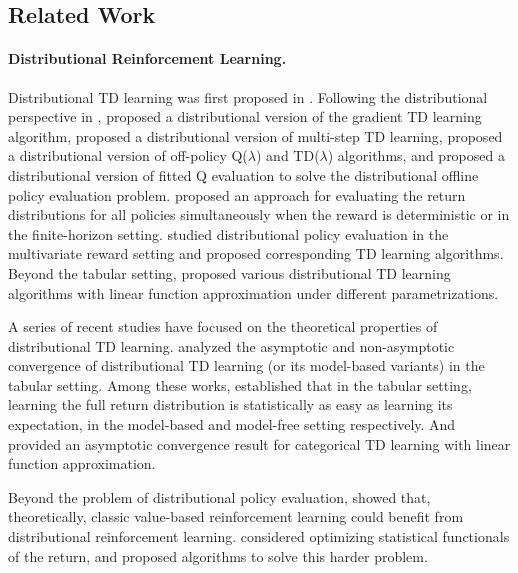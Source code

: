 \subsection{Related Work}
\paragraph{Distributional Reinforcement Learning.}
Distributional TD learning was first proposed in \citep{bellemare2017distributional}.
Following the distributional perspective in \citep{bellemare2017distributional}, \cite{pmlr-v97-qu19b} proposed a distributional version of the gradient TD learning algorithm,
\cite{tang2022nature} proposed a distributional version of multi-step TD learning, \cite{tang2024off} proposed a distributional version of off-policy Q($\lambda$) and TD($\lambda$) algorithms, and \citet{pmlr-v202-wu23s} proposed a distributional version of fitted Q evaluation to solve the distributional offline policy evaluation problem.
\cite{wiltzer2024dsm} proposed an approach for evaluating the return distributions for all policies simultaneously when the reward is deterministic or in the finite-horizon setting. 
\cite{wiltzer2024foundations} studied distributional policy evaluation in the multivariate reward setting and proposed corresponding TD learning algorithms.
Beyond the tabular setting, \cite{bellemare2019distributional,lyle2019comparative,bdr2022} proposed various distributional TD learning algorithms with linear function approximation under different parametrizations.

A series of recent studies have focused on the theoretical properties of distributional TD learning.
\cite{rowland2018analysis,speedy,zhang2023estimation,rowland2024analysis,rowland2024nearminimaxoptimal,peng2024statistical} analyzed the asymptotic and non-asymptotic convergence of distributional TD learning (or its model-based variants) in the tabular setting.
Among these works, \cite{rowland2024nearminimaxoptimal,peng2024statistical} established that in the tabular setting, learning the full return distribution is statistically as easy as learning its expectation, in the model-based and model-free setting respectively.
And \cite{bellemare2019distributional} provided an asymptotic convergence result for categorical TD learning with linear function approximation.

Beyond the problem of distributional policy evaluation,
\cite{rowland2023statistical,NEURIPS2023_06fc38f5, wang2024more} showed that, theoretically, classic value-based reinforcement learning could benefit from distributional reinforcement learning.
\cite{bauerle2011markov,chow2014algorithms,marthe2023beyond,noorani2023exponential,pires2025optimizing} considered optimizing statistical functionals of the return, and proposed algorithms to solve this harder problem.

